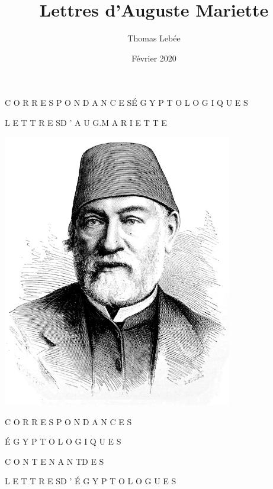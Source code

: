 \documentclass{book}
\title{Lettres d'Auguste Mariette}
\author{Thomas Lebée}
\date{Février 2020}
\begin{document}
\begin{titlepage}
\centering

\hspace{0pt}
\vfill
\large
C O R R E S P O N D A N C E S\space\space\space É G Y P T O L O G I Q U E S \vspace{3\baselineskip}

\Large L E T T R E S\space\space\space D ’ A U G.\space\space\space M A R I E T T E
\vspace{15\baselineskip}
\vfill
\hspace{0pt}

\pagebreak

\hspace{0pt}
\vfill
\includegraphics[height=12cm]{CoEg_Mariette_portrait.jpg}
\vfill
\hspace{0pt}

\pagebreak


\LARGE{C O R R E S P O N D A N C E S}
    
\Huge{É G Y P T O L O G I Q U E S}
\vspace{1\baselineskip}

\large C O N T E N A N T\space\space\space D E S
\vspace{1\baselineskip}

\Large L E T T R E S\space\space\space D ’ É G Y P T O L O G U E S
\vspace{2\baselineskip}


\end{titlepage}
\end{document}
